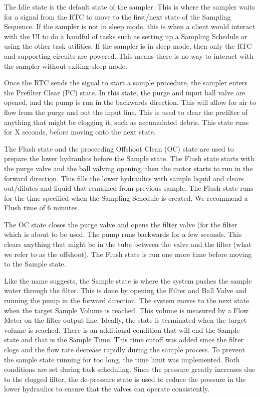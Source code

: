\documentclass[11pt, letterpaper]{article}
\begin{document}

The Idle state is the default state of the sampler. This is where the sampler waits for a signal from the RTC to move to the first/next state of the Sampling Sequence. If the sampler is not in sleep mode, this is when a client would interact with the UI to do a handful of tasks such as setting up a Sampling Schedule or using the other task utilities. If the sampler is in sleep mode, then only the RTC and supporting circuits are powered. This means there is no way to interact with the sampler without exiting sleep mode.
\newline\par
Once the RTC sends the signal to start a sample procedure, the sampler enters the Prefilter Clear (PC) state. In this state, the purge and input ball valve are opened, and the pump is run in the backwards direction. This will allow for air to flow from the purge and out the input line. This is used to clear the prefilter of anything that might be clogging it, such as accumulated debris. This state runs for X seconds, before moving onto the next state. 
\newline\par
The Flush state and the proceeding Offshoot Clean (OC) state are used to prepare the lower hydraulics before the Sample state. The Flush state starts with the purge valve and the ball valving opening, then the motor starts to run in the forward direction. This fills the lower hydraulics with sample liquid and clears out/dilutes and liquid that remained from previous sample. The Flush state runs for the time specified when the Sampling Schedule is created. We recommend a Flush time of 6 minutes. 
\newline\par
The OC state closes the purge valve and opens the filter valve (for the filter which is about to be used. The pump runs backwards for a few seconds. This clears anything that might be in the tube between the valve and the filter (what we refer to as the offshoot). The Flush state is run one more time before moving to the Sample state.
\newline\par
Like the name suggests, the Sample state is where the system pushes the sample water through the filter. This is done by opening the Filter and Ball Valve and running the pump in the forward direction. The system moves to the next state when the target Sample Volume is reached. This volume is measured by a Flow Meter on the filter output line. Ideally, the state is terminated when the target volume is reached. There is an additional condition that will end the Sample state and that is the Sample Time. This time cutoff was added since the filter clogs and the flow rate decrease rapidly during the sample process. To prevent the sample state running for too long, the time limit was implemented. Both conditions are set during task scheduling. Since the pressure greatly increases due to the clogged filter, the de-pressure state is used to reduce the pressure in the lower hydraulics to ensure that the valves can operate consistently.
\end{document}
